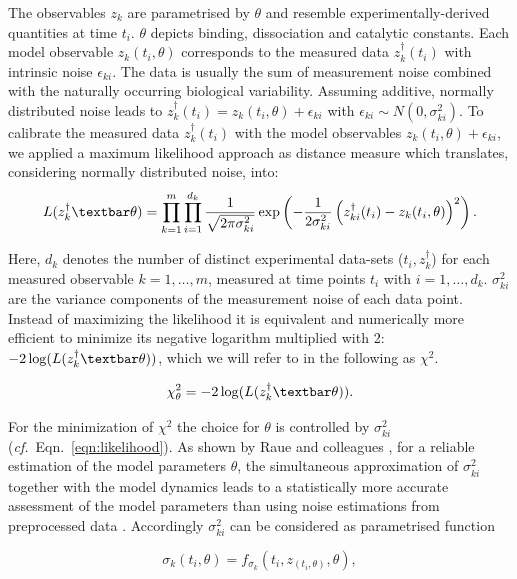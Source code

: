 The observables $z_k$ are parametrised by $\theta$ and resemble experimentally-derived quantities at time $t_i$. $\theta$ depicts binding, dissociation and catalytic constants. Each model observable $z_k(t_i,\theta)$ corresponds to the measured data $z_k^\dag(t_i)$ with intrinsic noise $\epsilon_{ki}$. The data is usually the sum of measurement noise combined with the naturally occurring biological variability. Assuming additive, normally distributed noise leads to $z_k^\dag(t_i) = z_k(t_i,\theta) + \epsilon_{ki}$ with $\epsilon_{ki} \sim N(0,\sigma_{ki}^2)$. To calibrate the measured data $z_k^\dag(t_i)$ with the model observables $z_k(t_i,\theta)+\epsilon_{ki}$, we applied a maximum likelihood approach as distance measure which translates, considering normally distributed noise, into:
\begin{equation}
\label{eqn:likelihood}
L(z_k^\dag \textbar \theta) = \prod_{k=1}^m \prod_{i=1}^{d_k} \frac{1}{\sqrt{2\pi \sigma_{ki}^2}}\exp \left( -\frac{1}{2\sigma_{ki}^2}\left(z_{ki}^\dag(t_i) - z_k(t_i,\theta)\right)^2\right).
\end{equation}
  
Here, $d_k$ denotes the number of distinct experimental data-sets ($t_i,z_k^\dag$) for each measured observable $k = 1,\ldots,m$, measured at time points $t_i$ with $i = 1,\ldots,d_k$. $\sigma_{ki}^2$ are the variance components of the measurement noise of each data point. Instead of maximizing the likelihood it is equivalent and numerically more efficient to minimize its negative logarithm multiplied with 2: $-2\log(L(z_k^\dag\textbar\theta))$, which we will refer to in the following as $\chi^{2}$.  

\begin{equation}\label{eqn:chiSquare}
\chi_\theta^2 = -2\log(L(z_k^\dag\textbar\theta)).
\end{equation}

For the minimization of $\chi^{2}$ the choice for $\theta$ is controlled by $\sigma_{ki}^2$ (\textit{cf.}\ Eqn.\ \ref{eqn:likelihood}). As shown by Raue and colleagues \cite{Raue2013}, for a reliable estimation of the model parameters $\theta$, the simultaneous approximation of $\sigma_{ki}^2$ together with the model dynamics leads to a statistically more accurate assessment of the model parameters than using noise estimations from preprocessed data \cite{Raue2013}. Accordingly $\sigma_{ki}^2$ can be considered as parametrised function

\begin{equation}
\sigma_{k}(t_i,\theta) = f_{\sigma_{k}}(t_i,z_(t_i,\theta),\theta),
\end{equation}    

